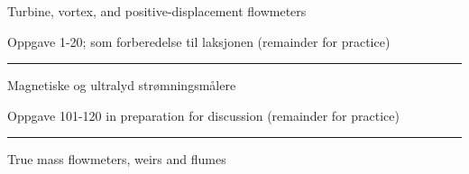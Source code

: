 \vskip 2pt  Turbine, vortex, and positive-displacement flowmeters

\vskip 2pt \noindent Oppgave 1-20;  som forberedelse til laksjonen (remainder for practice)

\vskip 10pt



\filbreak
\hrule \vskip 5pt
\noindent {}

\vskip 5pt



\vskip 2pt  Magnetiske og ultralyd strømningsmålere 

\vskip 2pt \noindent Oppgave 101-120  in preparation for discussion (remainder for practice)

\vskip 10pt



\filbreak
\hrule \vskip 5pt
\noindent {}

\vskip 5pt



\vskip 2pt  True mass flowmeters, weirs and flumes

